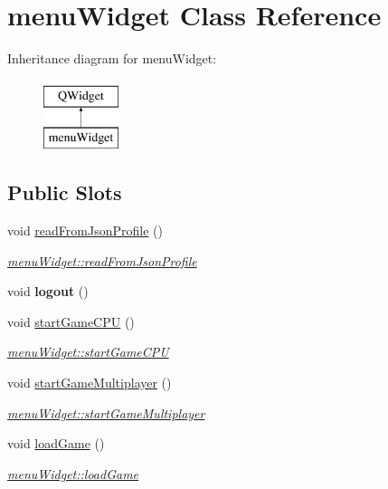 \hypertarget{classmenuWidget}{\section{menu\-Widget Class Reference}
\label{classmenuWidget}
}
Inheritance diagram for menu\-Widget\-:\begin{figure}[H]
\begin{center}
\leavevmode
\includegraphics[height=2.000000cm]{classmenuWidget}
\end{center}
\end{figure}
\subsection*{Public Slots}
\begin{DoxyCompactItemize}
\item 
void \hyperlink{classmenuWidget_a3380372012023661288a213ba4b4a863}{read\-From\-Json\-Profile} ()
\begin{DoxyCompactList}\small\item\em \hyperlink{classmenuWidget_a3380372012023661288a213ba4b4a863}{menu\-Widget\-::read\-From\-Json\-Profile} \end{DoxyCompactList}\item 
\hypertarget{classmenuWidget_a0f1b8132d994d08682389e2a344a36ba}{void {\bfseries logout} ()}\label{classmenuWidget_a0f1b8132d994d08682389e2a344a36ba}

\item 
void \hyperlink{classmenuWidget_ad5ec96474e3d43c8e011b5c38a596b23}{start\-Game\-C\-P\-U} ()
\begin{DoxyCompactList}\small\item\em \hyperlink{classmenuWidget_ad5ec96474e3d43c8e011b5c38a596b23}{menu\-Widget\-::start\-Game\-C\-P\-U} \end{DoxyCompactList}\item 
void \hyperlink{classmenuWidget_a3a0360ab73e02b2a3dfa6d046976704b}{start\-Game\-Multiplayer} ()
\begin{DoxyCompactList}\small\item\em \hyperlink{classmenuWidget_a3a0360ab73e02b2a3dfa6d046976704b}{menu\-Widget\-::start\-Game\-Multiplayer} \end{DoxyCompactList}\item 
void \hyperlink{classmenuWidget_a519165c04c3861080c71530a5bc2afed}{load\-Game} ()
\begin{DoxyCompactList}\small\item\em \hyperlink{classmenuWidget_a519165c04c3861080c71530a5bc2afed}{menu\-Widget\-::load\-Game} \end{DoxyCompactList}\end{DoxyCompactItemize}
